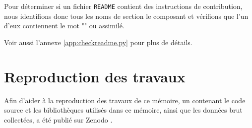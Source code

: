 Pour déterminer si un fichier \texttt{README} contient des instructions de contribution, nous identifions donc
tous les noms de section le composant et vérifions que l'un d'eux contiennent le mot "" ou
assimilé.

Voir aussi l'annexe \ref{app:checkreadme.py} pour plus de détails.

\section{Reproduction des travaux}

Afin d'aider à la reproduction des travaux de ce mémoire, un  contenant le code source
et les bibliothèques utilisés dans ce mémoire, ainsi que les données brut collectées, a été publié sur Zenodo
\parencite{replication-package}.
